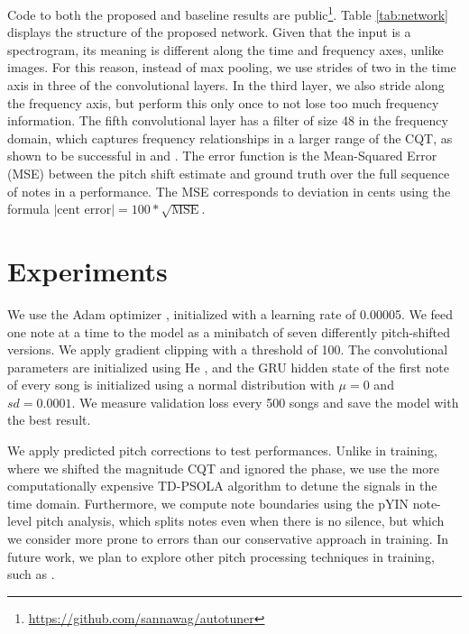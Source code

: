 Code to both the proposed and baseline results are public\footnote{\href{https://github.com/sannawag/autotuner}{https://github.com/sannawag/autotuner}}. Table \ref{tab:network} displays the structure of the proposed network. Given that the input is a spectrogram, its meaning is different along the time and frequency axes, unlike images. For this reason, instead of max pooling, we use strides of two in the time axis in three of the convolutional layers. In the third layer, we also stride along the frequency axis, but perform this only once to not lose too much frequency information. The fifth convolutional layer has a filter of size 48 in the frequency domain, which captures frequency relationships in a larger range of the CQT, as shown to be successful in \cite{bittner2017deep} and \cite{hsu2017learning}. The error function is the Mean-Squared Error (MSE) between the pitch shift estimate and ground truth over the full sequence of notes in a performance. The MSE corresponds to deviation in cents using the formula $\left|\text{cent error}\right| = 100 * \sqrt{\text{MSE}}$.


\section{Experiments}
\label{sec:experiments-autotune}

We use the Adam optimizer \cite{kingma2014adam}, initialized with a learning rate of 0.00005. We feed one note at a time to the model as a minibatch of seven differently pitch-shifted versions. We apply gradient clipping \cite{pascanu2013difficulty} with a threshold of 100. The convolutional parameters are initialized using He \cite{he2015delving}, and the GRU hidden state of the first note of every song is initialized using a normal distribution with $\mu=0$ and $sd=0.0001$. We measure validation loss every 500 songs and save the model with the best result. 

We apply predicted pitch corrections to test performances. Unlike in training, where we shifted the magnitude CQT and ignored the phase, we use the more computationally expensive TD-PSOLA algorithm \cite{charpentier1986diphone} to detune the signals in the time domain. Furthermore, we compute note boundaries using the pYIN note-level pitch analysis, which splits notes even when there is no silence, but which we consider more prone to errors than our conservative approach in training. In future work, we plan to explore other pitch processing techniques in training, such as \cite{waloschek2018driftin}.

